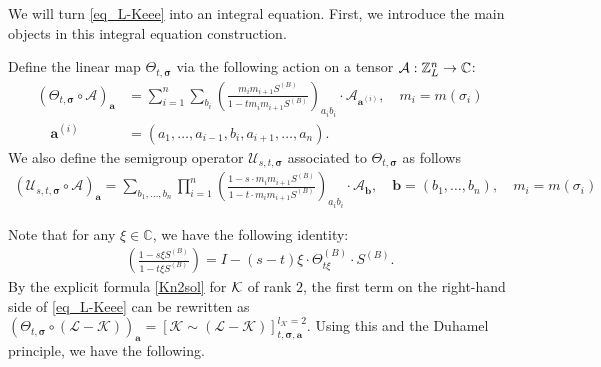 We will turn \eqref{eq_L-Keee} into an integral equation. First, we introduce the main objects in this integral equation construction.


\begin{definition}\label{DefTHUST}
Define the linear map ${\varTheta}_{t, \boldsymbol{\sigma}}$ via the following action on a tensor ${\cal A}: \mathbb Z^n_L\to \mathbb C$: 
\begin{align}
    \left({{\varTheta}}_{t, \boldsymbol{\sigma}} \circ \mathcal{A}\right)_{\textbf{a}} & = \sum_{i=1}^n \sum_{b_i} \left(\frac{m_i m_{i+1} S^{(B)} }{1 - t m_i m_{i+1} S^{(B)}}\right)_{a_i b_i} \cdot \mathcal{A}_{\textbf{a}^{(i)}},\quad m_i=m(\sigma_i) \nonumber \\
    \quad \textbf{a}^{(i)}&  = (a_1, \ldots, a_{i-1}, b_i, a_{i+1}, \ldots, a_n).
\end{align}  
We also define the semigroup operator $\mathcal{U}_{s,t,\boldsymbol{\sigma}}$ associated to $\Theta_{t,\boldsymbol{\sigma}}$ as follows
    \begin{align}\label{def_Ustz}
        \left(\mathcal{U}_{s, t, \boldsymbol{\sigma}} \circ \mathcal{A}\right)_{\textbf{a}} = \sum_{b_1, \ldots, b_n} \prod_{i=1}^n \left(\frac{1 - s \cdot m_i m_{i+1} S^{(B)}}{1 - t \cdot m_i m_{i+1} S^{(B)}}\right)_{a_i b_i} \cdot \mathcal{A}_{\textbf{b}}, \quad \textbf{b} = (b_1, \ldots, b_n), \quad m_i=m(\sigma_i)
    \end{align}
\end{definition}
Note that for any $\xi \in \mathbb{C}$, we have the following identity:
 \begin{align}\label{def_Ustz_2}
\left(\frac{1 - s \xi S^{(B)}}{1 - t \xi S^{(B)}}\right) = I - (s - t) \xi \cdot \Theta^{(B)}_{t \xi} \cdot S^{(B)}.
\end{align}
By the explicit formula \eqref{Kn2sol} for ${\cal K}$ of rank $2$, the first term on the right-hand side of \eqref{eq_L-Keee} can be rewritten as $({\varTheta}_{t, \boldsymbol{\sigma}} \circ (\mathcal{L} - \mathcal{K}))_{\textbf{a}} = [\mathcal{K} \sim (\mathcal{L} - \mathcal{K})]^{l_\mathcal{K} = 2}_{t, \boldsymbol{\sigma}, \textbf{a}}$. Using this and the Duhamel principle, we have the following.


